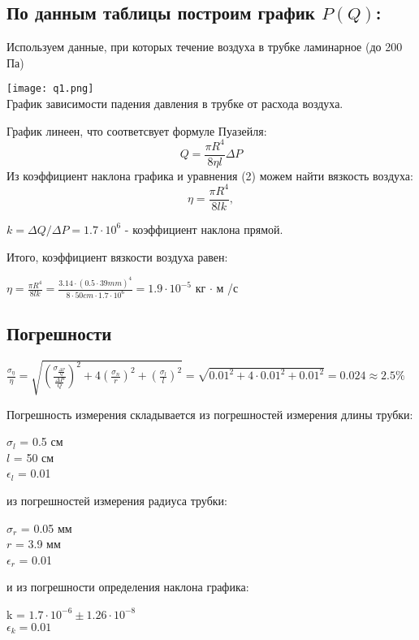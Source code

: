 \documentclass{article}
\begin{document}
    \subsection{По данным таблицы построим график $P(Q)$:}
        Используем данные, при которых течение воздуха в трубке ламинарное (до 200 Па)
    \begin{center}
        \texttt{[image: q1.png]}\\
        График зависимости падения давления в трубке от расхода воздуха.
    \end{center}
    График линеен, что соответсвует формуле Пуазейля:
    \begin{equation}
        Q = \frac{\pi R^4}{8 \eta l} \Delta P
    \end{equation}
    \newpage
    Из коэффициент наклона графика и уравнения (2) можем найти вязкость воздуха:
    \begin{equation}
        \eta = \frac{\pi R^4}{8lk},
    \end{equation}
    \begin{center}
        $k = \Delta Q/ \Delta P = 1.7\cdot10^6$ - коэффициент наклона прямой.
    \end{center}
    Итого, коэффициент вязкости воздуха равен:\\
    \begin{center}
        $\eta = \frac{\pi R^4}{8lk} = \frac{3.14 \cdot (0.5 \cdot 39mm)^4}{8 \cdot 50cm \cdot 1.7 \cdot 10^6} = 1.9 \cdot 10^{-5}$ кг $\cdot$ м /с
    \end{center}
    \subsection{Погрешности}
        \begin{center}
            $\frac{\sigma_\eta}{\eta} = \sqrt{(\frac{\sigma_\frac{\Delta P}{Q}}{\frac{\Delta P}{Q}})^2 + 4(\frac{\sigma_n}{r})^2 + (\frac{\sigma_l}{l})^2} = \sqrt{0.01^2 + 4 \cdot 0.01^2 + 0.01^2} = 0.024 \approx 2.5\%$
        \end{center}
    Погрешность измерения складывается из погрешностей измерения длины трубки:
    \begin{center}
        $\sigma_l$ = 0.5 см\\
        $l$ = 50 см\\
        $\epsilon_l$ = 0.01
    \end{center}
    из погрешностей измерения радиуса трубки:
    \begin{center}
        $\sigma_r$ = 0.05 мм\\
        $r$ = 3.9 мм\\
        $\epsilon_r$ = 0.01
    \end{center}
    и из погрешности определения наклона графика:
    \begin{center}
        k = $1.7 \cdot 10^{-6} \pm 1.26 \cdot 10^{-8}$\\
        $\epsilon_k = 0.01$
    \end{center}
\end{document}
